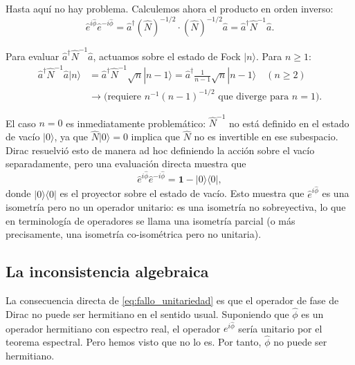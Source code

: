         Hasta aquí no hay problema. Calculemos ahora el producto en orden inverso:
        \begin{equation}
            \hat{e}^{i\hat{\phi}} \hat{e}^{-i\hat{\phi}} = \hat{a}^{\dagger} (\hat{N})^{-1/2} \cdot (\hat{N})^{-1/2} \hat{a} = \hat{a}^{\dagger} \hat{N}^{-1} \hat{a}.
            \label{eq:producto2}
        \end{equation}
        
        Para evaluar $\hat{a}^{\dagger} \hat{N}^{-1} \hat{a}$, actuamos sobre el estado de Fock $|n\rangle$. Para $n \geq 1$:
        \begin{align}
            \hat{a}^{\dagger} \hat{N}^{-1} \hat{a} |n\rangle &= \hat{a}^{\dagger} \hat{N}^{-1} \sqrt{n} |n-1\rangle = \hat{a}^{\dagger} \frac{1}{n-1}\sqrt{n}|n-1\rangle \quad (n \geq 2) \nonumber\\
            &\to \text{(requiere } n^{-1}(n-1)^{-1/2}\text{ que diverge para } n=1).
        \end{align}
        
        El caso $n = 0$ es inmediatamente problemático: $\hat{N}^{-1}$ no está definido en el estado de vacío $|0\rangle$, ya que $\hat{N}|0\rangle = 0$ implica que $\hat{N}$ no es invertible en ese subespacio. Dirac resuelvió esto de manera ad hoc definiendo la acción sobre el vacío separadamente, pero una evaluación directa muestra que
        \begin{equation}
            \hat{e}^{i\hat{\phi}} \hat{e}^{-i\hat{\phi}} = \mathbf{1} - |0\rangle\langle 0|,
            \label{eq:fallo_unitariedad}
        \end{equation}
        donde $|0\rangle\langle 0|$ es el proyector sobre el estado de vacío. Esto muestra que $\hat{e}^{i\hat{\phi}}$ es una isometría pero no un operador unitario: es una isometría no sobreyectiva, lo que en terminología de operadores se llama una isometría parcial (o más precisamente, una isometría co-isométrica pero no unitaria).
 
        \subsection{La inconsistencia algebraica}
        
            La consecuencia directa de \eqref{eq:fallo_unitariedad} es que el operador de fase de Dirac no puede ser hermitiano en el sentido usual. Suponiendo que $\hat{\phi}$ es un operador hermitiano con espectro real, el operador $e^{i\hat{\phi}}$ sería unitario por el teorema espectral. Pero hemos visto que no lo es. Por tanto, $\hat{\phi}$ no puede ser hermitiano.
            
